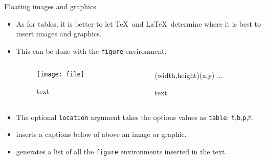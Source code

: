 \begin{frame}[fragile,c]{Floating images and graphics}
	\begin{itemize}
		\item As for tables, it is better to let \TeX\ and \LaTeX\ determine where it is best to insert images and graphics.
		\item This can be done with the \texttt{figure} environment.
		\vspace{-2.2mm}
		\begin{columns}
			\begin{column}{.4\textwidth}
\begin{codesource}
	\begin{figure}[location]
		\texttt{[image: file]}
		\caption{text}
	\end{figure}
\end{codesource}
			\end{column}
			\begin{column}{.4\textwidth}
\begin{codesource}
	\begin{figure}[location]
		\begin{picture}(width,height)(x,y)
			...
		\end{picture}
		\caption{text}
	\end{figure}
\end{codesource}
			\end{column}
		\end{columns}
	
		\pause
		\item The optional \texttt{location} argument takes the options values as \texttt{table}: \texttt{t},\texttt{b},\texttt{p},\texttt{h}.
		\item {} inserts a captions below of above an image or graphic.
		\item {} generates a list of all the \texttt{figure} environments inserted in the text.
	\end{itemize}
\end{frame}